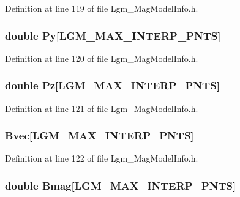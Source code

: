 Definition at line 119 of file Lgm\_\-MagModelInfo.h.\hypertarget{struct_lgm___mag_model_info_8a91bcce4c333afd8126b6a186dd59d7}{
\subsubsection[{Py}]{\setlength{\rightskip}{0pt plus 5cm}double {\bf Py}\mbox{[}LGM\_\-MAX\_\-INTERP\_\-PNTS\mbox{]}}}
\label{struct_lgm___mag_model_info_8a91bcce4c333afd8126b6a186dd59d7}




Definition at line 120 of file Lgm\_\-MagModelInfo.h.\hypertarget{struct_lgm___mag_model_info_042f2ba75b091726dca685c45f9be927}{
\subsubsection[{Pz}]{\setlength{\rightskip}{0pt plus 5cm}double {\bf Pz}\mbox{[}LGM\_\-MAX\_\-INTERP\_\-PNTS\mbox{]}}}
\label{struct_lgm___mag_model_info_042f2ba75b091726dca685c45f9be927}




Definition at line 121 of file Lgm\_\-MagModelInfo.h.\hypertarget{struct_lgm___mag_model_info_ee6c1c35a439c2b6b3d968446dffb31a}{
\subsubsection[{Bvec}]{ {\bf Bvec}\mbox{[}LGM\_\-MAX\_\-INTERP\_\-PNTS\mbox{]}}}
\label{struct_lgm___mag_model_info_ee6c1c35a439c2b6b3d968446dffb31a}




Definition at line 122 of file Lgm\_\-MagModelInfo.h.\hypertarget{struct_lgm___mag_model_info_7d9e308c1b0c6e09a52f4c3c2d93b6cb}{
\subsubsection[{Bmag}]{\setlength{\rightskip}{0pt plus 5cm}double {\bf Bmag}\mbox{[}LGM\_\-MAX\_\-INTERP\_\-PNTS\mbox{]}}}
\label{struct_lgm___mag_model_info_7d9e308c1b0c6e09a52f4c3c2d93b6cb}




